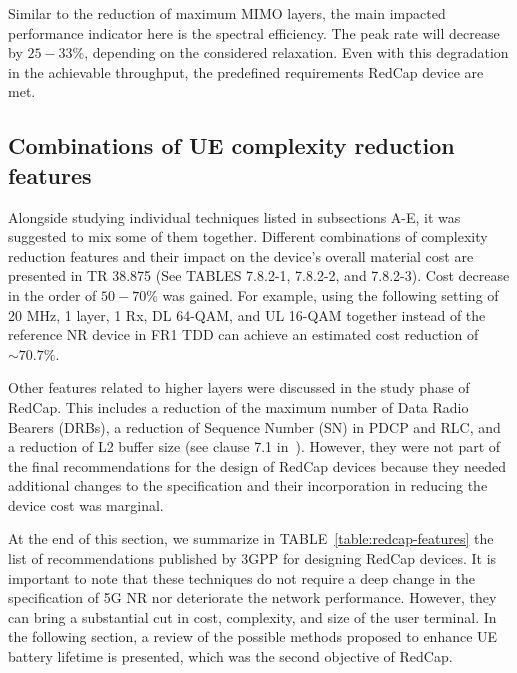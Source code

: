 \documentclass[]{IEEEtran}
\begin{document}
Similar to the reduction of maximum MIMO layers, the main impacted performance indicator here is the spectral efficiency. The peak rate will decrease by $25-33\%$, depending on the considered relaxation. Even with this degradation in the achievable throughput, the predefined requirements RedCap device are met.  

\subsection{Combinations of UE complexity reduction features}
\label{sec:4-6}
Alongside studying individual techniques listed in subsections A-E, it was suggested to mix some of them together. Different combinations of complexity reduction features and their impact on the device's overall material cost are presented in TR 38.875 (See TABLES 7.8.2-1, 7.8.2-2, and 7.8.2-3). Cost decrease in the order of $50-70\%$ was gained. For example, using the following setting of 20 MHz, 1 layer, 1 Rx, DL 64-QAM, and UL 16-QAM together instead of the reference NR device in FR1 TDD can achieve an estimated cost reduction of $\sim70.7\%$.

Other features related to higher layers were discussed in the study phase of RedCap. This includes a reduction of the maximum number of Data Radio Bearers (DRBs), a reduction of Sequence Number (SN) in PDCP and RLC, and a reduction of L2 buffer size (see clause 7.1 in~\cite{3gpp_study_2021_38.875}). However, they were not part of the final recommendations for the design of RedCap devices because they needed additional changes to the specification and their incorporation in reducing the device cost was marginal.

At the end of this section, we summarize in TABLE~\ref{table:redcap-features} the list of recommendations published by 3GPP for designing RedCap devices. It is important to note that these techniques do not require a deep change in the specification of 5G NR nor deteriorate the network performance. However, they can bring a substantial cut in cost, complexity, and size of the user terminal. In the following section, a review of the possible methods proposed to enhance UE battery lifetime is presented, which was the second objective of RedCap.
\end{document}
